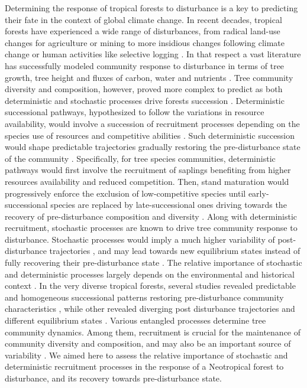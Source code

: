 \documentclass[fleqn,10pt]{ArtEcoFoG} %
\begin{document}
Determining the response of tropical forests to disturbance is a key to predicting their fate in the context of global climate change. In recent decades, tropical forests have experienced a wide range of disturbances, from radical land-use changes for agriculture or mining \citep{Dezecache2017a, Dezecache2017b} to more insidious changes following climate change or human activities like selective logging \citep{Baraloto2012a, Aubry-Kientz2015}.
In that respect a vast literature has successfully modeled community response to disturbance in terms of tree growth, tree height and fluxes of carbon, water and nutrients \citep{Gourlet-Fleury2000, Putz2012, Piponiot2016, Rutishauser2016}.
Tree community diversity and composition, however, proved more complex to predict as both deterministic and stochastic processes drive forests succession \citep{Norden2015}.
Deterministic successional pathways, hypothesized to follow the variations in resource availability, would involve a succession of recruitment processes depending on the species use of resources and competitive abilities \citep{Clements1916, Meiners2015}.
Such deterministic succession would shape predictable trajectories gradually restoring the pre-disturbance state of the community \citep{Chesson2000, Rees2001, Adler2007}.
Specifically, for tree species communities, deterministic pathways would first involve the recruitment of saplings benefiting from higher resources availability and reduced competition. Then, stand maturation would progressively enforce the exclusion of low-competitive species until early-successional species are replaced by late-successional ones driving towards the recovery of pre-disturbance composition and diversity \citep{Denslow2000}.
Along with deterministic recruitment, stochastic processes are known to drive tree community response to disturbance.
Stochastic processes would imply a much higher variability of post-disturbance trajectories \citep{Brokaw2000, Norden2015}, and may lead towards new equilibrium states instead of fully recovering their pre-disturbance state \citep{Hubbell2001, Chave2004}.
The relative importance of stochastic and deterministic processes largely depends on the environmental and historical context \citep{Chazdon2008, Norden2015}.
In the very diverse tropical forests, several studies revealed predictable and homogeneous successional patterns restoring pre-disturbance community characteristics \citep{Norden2009, Letcher2015}, while other revealed diverging post disturbance trajectories and different equilibrium states \citep{Longworth2014}.
Various entangled processes determine tree community dynamics. Among them, recruitment is crucial for the maintenance of community diversity and composition, and may also be an important source of variability \citep{Grubb1977, Hurtt1995, Clark1998}.
We aimed here to assess the relative importance of stochastic and deterministic recruitment processes in the response of a Neotropical forest to disturbance, and its recovery towards pre-disturbance state.
\end{document}
